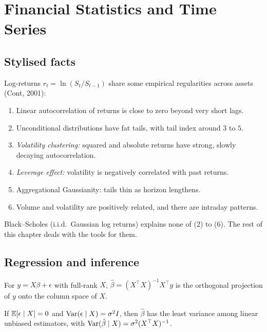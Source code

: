 \chapter{Financial Statistics and Time Series}\label{ch:stats}

\section{Stylised facts}

Log-returns $r_t=\ln(S_t/S_{t-1})$ share some empirical regularities across assets (Cont, 2001):
\begin{enumerate}
\item Linear autocorrelation of returns is close to zero beyond very short lags.
\item Unconditional distributions have fat tails, with tail index around $3$ to $5$.
\item \emph{Volatility clustering:} squared and absolute returns have strong, slowly decaying autocorrelation.
\item \emph{Leverage effect:} volatility is negatively correlated with past returns.
\item Aggregational Gaussianity: tails thin as horizon lengthens.
\item Volume and volatility are positively related, and there are intraday patterns.
\end{enumerate}
Black--Scholes (i.i.d.\ Gaussian log returns) explains none of (2) to (6). The rest of this chapter deals with the tools for them.

\section{Regression and inference}

For $y=X\beta+\epsilon$ with full-rank $X$, $\hat\beta=(X^\top X)^{-1}X^\top y$ is the orthogonal projection of $y$ onto the column space of $X$.

\begin{theorem}
If $\mathbb{E}[\epsilon\mid X]=0$ and $\operatorname{Var}(\epsilon\mid X)=\sigma^2I$, then $\hat\beta$ has the least variance among linear unbiased estimators, with $\operatorname{Var}(\hat\beta\mid X)=\sigma^2(X^\top X)^{-1}$.
\end{theorem}

